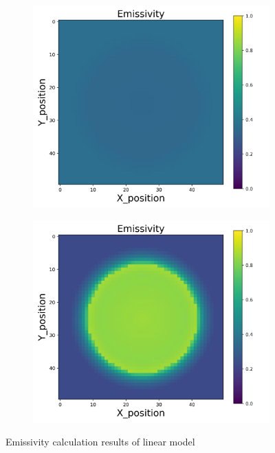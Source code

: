 {\begin{figure}[h]
\begin{minipage}{\textwidth}
\begin{subfigure}{0.27\textwidth}
        \end{subfigure}
        \begin{subfigure}{0.27\textwidth}
            \centering
            \includegraphics[width=\textwidth]{figures/raw_data/32/T3500/linear/emi_cal.jpg}
        \end{subfigure}
        \begin{subfigure}{0.27\textwidth}
            \centering
            \includegraphics[width=\textwidth]{figures/raw_data/33/T3500/linear/emi_cal.jpg}
        \end{subfigure}
    \end{minipage}
    \caption{Emissivity calculation results of linear model}  
\end{figure}

}
